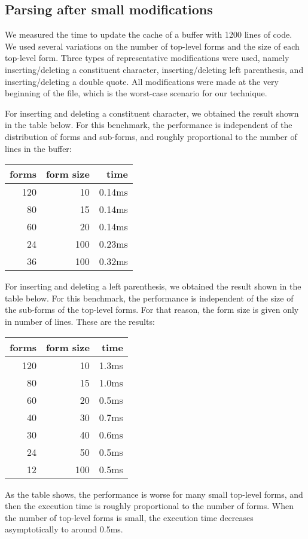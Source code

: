 \subsection{Parsing after small modifications}

We measured the time to update the cache of a buffer with 1200 lines
of \commonlisp{} code.  We used several variations on the number of
top-level forms and the size of each top-level form.  Three types of
representative modifications were used, namely inserting/deleting a
constituent character, inserting/deleting left parenthesis, and
inserting/deleting a double quote.  All modifications were made at the
very beginning of the file, which is the worst-case scenario for our
technique.

For inserting and deleting a constituent character, we obtained the
result shown in the table below.  For this benchmark, the performance
is independent of the distribution of forms and sub-forms, and roughly
proportional to the number of lines in the buffer:

\vskip 0.3cm
\begin{tabular}{|r|r|r|}
\hline
forms & form size & time\\
\hline
120 & 10 & 0.14ms\\
80 & 15  & 0.14ms\\
60 & 20  & 0.14ms\\
24 & 100 & 0.23ms\\
36 & 100 & 0.32ms\\
\hline
\end{tabular}
\vskip 0.3cm

For inserting and deleting a left parenthesis, we obtained the
result shown in the table below.  For this benchmark, the performance
is independent of the size of the sub-forms of the top-level forms.
For that reason, the form size is given only in number of lines.
These are the results:

\vskip 0.3cm
\begin{tabular}{|r|r|r|}
\hline
forms & form size & time\\
\hline
120 & 10 & 1.3ms\\
80 & 15  & 1.0ms\\
60 & 20  & 0.5ms\\
40 & 30  & 0.7ms\\
30 & 40  & 0.6ms\\
24 & 50  & 0.5ms\\
12 & 100 & 0.5ms\\
\hline
\end{tabular}
\vskip 0.3cm

As the table shows, the performance is worse for many small top-level
forms, and then the execution time is roughly proportional to the
number of forms.  When the number of top-level forms is small, the
execution time decreases asymptotically to around 0.5ms.

